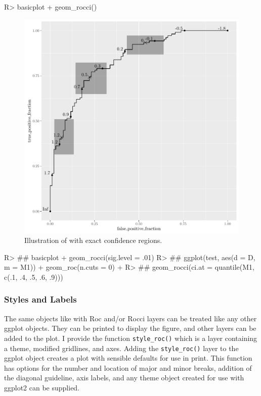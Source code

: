 \documentclass[codesnippet]{jss}
\begin{document}
\begin{Schunk}
\begin{Sinput}
R> basicplot + geom_rocci()
\end{Sinput}
\begin{figure}
\includegraphics{figure/test-a-ci-1} \caption{Illustration of  with exact confidence regions. \label{ciex}}\label{fig:test-a-ci}
\end{figure}
\begin{Sinput}
R> ## basicplot + geom_rocci(sig.level = .01)
R> ## ggplot(test, aes(d = D, m = M1)) + geom_roc(n.cuts = 0) +
R> ##   geom_rocci(ci.at = quantile(M1, c(.1, .4, .5, .6, .9)))
\end{Sinput}
\end{Schunk}

\subsubsection{Styles and Labels}\label{styles-and-labels}

The same objects like  with Roc and/or Rocci layers can
be treated like any other ggplot objects. They can be printed to display
the figure, and other layers can be added to the plot. I provide the
function \texttt{style\_roc()} which is a layer containing a theme,
modified gridlines, and axes. Adding the \texttt{style\_roc()} layer to
the ggplot object creates a plot with sensible defaults for use in
print. This function has options for the number and location of major
and minor breaks, addition of the diagonal guideline, axis labels, and
any theme object created for use with ggplot2 can be supplied.
\end{document}
